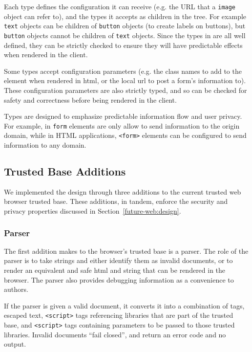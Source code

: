 Each type defines the configuration it can receive (e.g. the
URL that a \texttt{image} object can refer to), and the types it
accepts as children in the tree.  For example \texttt{text} objects can be
children of \texttt{button} objects (to create labels on buttons), but
\texttt{button} objects cannot be children of \texttt{text} objects.
Since the types in \CDF are all well defined, they can be strictly checked to
ensure they will have predictable effects when rendered in the client.

Some types accept configuration parameters (e.g. the class names to add to the
element when rendered in \gls{html}, or the local \gls{url} to post a form's
information to).  These configuration parameters are also strictly typed, and
so can be checked for safety and correctness before being rendered in the
client.

Types are designed to emphasize predictable information flow and user privacy.
For example, in \CDF \texttt{form} elements are only allow to send information to
the origin domain, while in HTML applications, \texttt{<form>} elements
can be configured to send information to any domain.


\subsection{Trusted Base Additions}
We implemented the \CDF design through three additions to the current trusted
web browser trusted base.  These additions, in tandem, enforce the security and
privacy properties discussed in Section~\ref{future-web:design}.


\subsubsection{Parser}
The first addition \CDF makes to the browser's trusted base is a \CDF parser.
The role of the \CDF parser is to take strings and either identify them as
invalid \CDF documents, or to render an equivalent and safe \gls{html} and \JS
string that can be rendered in the browser. The parser also provides debugging
information as a convenience to \CDF authors.

If the parser is given a valid \CDF document, it converts it into a combination
of \HTML tags, escaped text, \texttt{<script>} tags referencing \JS libraries
that are part of the \CDF trusted base, and \texttt{<script>} tags containing
parameters to be passed to those trusted libraries.  Invalid documents
``fail closed'', and return an error code and no output.


